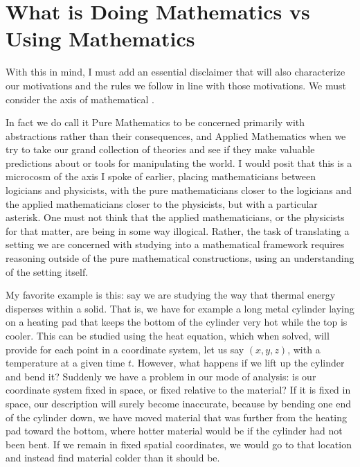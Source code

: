 \documentclass[11pt]{article}
\begin{document}
\section{What is Doing Mathematics vs Using Mathematics}

With this in mind, I must add an essential disclaimer that will also characterize our motivations and the rules we follow in line with those motivations. We must consider the axis of mathematical .

In fact we do call it Pure Mathematics to be concerned primarily with abstractions rather than their consequences, and Applied Mathematics when we try to take our grand collection of theories and see if they make valuable predictions about or tools for manipulating the world. I would posit that this is a microcosm of the axis I spoke of earlier, placing mathematicians between logicians and physicists, with the pure mathematicians closer to the logicians and the applied mathematicians closer to the physicists, but with a particular asterisk. One must not think that the applied mathematicians, or the physicists for that matter, are being in some way illogical. Rather, the task of translating a setting we are concerned with studying into a mathematical framework requires reasoning outside of the pure mathematical constructions, using an understanding of the setting itself.

My favorite example is this: say we are studying the way that thermal energy disperses within a solid. That is, we have for example a long metal cylinder laying on a heating pad that keeps the bottom of the cylinder very hot while the top is cooler. This can be studied using the heat equation, which when solved, will provide for each point in a coordinate system, let us say $(x,y,z)$, with a temperature at a given time $t$. However, what happens if we lift up the cylinder and bend it? Suddenly we have a problem in our mode of analysis: is our coordinate system fixed in space, or fixed relative to the material? If it is fixed in space, our description will surely become inaccurate, because by bending one end of the cylinder down, we have moved material that was further from the heating pad toward the bottom, where hotter material would be if the cylinder had not been bent. If we remain in fixed spatial coordinates, we would go to that location and instead find material colder than it should be.

\end{document}
